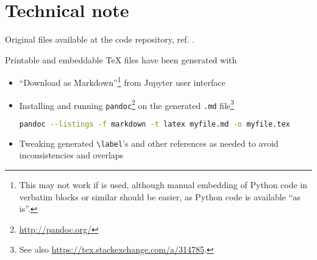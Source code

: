 \section*{Technical note}

Original files available at
the code repository, ref. \cite{OwnJupyterRepo}.

Printable and embeddable \TeX{} files have been generated with
\begin{itemize}
  \item
    ``Download as Markdown''\footnote{
      This may not work if  \parencite{Jupytext} is used,
      although manual embedding of
      Python code in verbatim blocks or similar should be easier, as Python code 
      is available ``as is''.
    }
    from Jupyter user interface
  \item
    Installing and running \verb#pandoc#\footnote{ \url{http://pandoc.org/}}
    on the generated \verb#.md# file\footnote{ See also \url{https://tex.stackexchange.com/a/314785}.}
    \begin{lstlisting}[language=Bash]
      pandoc --listings -f markdown -t latex myfile.md -o myfile.tex
    \end{lstlisting}
  \item
    Tweaking generated \verb#\label#'s and other references as needed to avoid inconsistencies and overlaps
\end{itemize}
